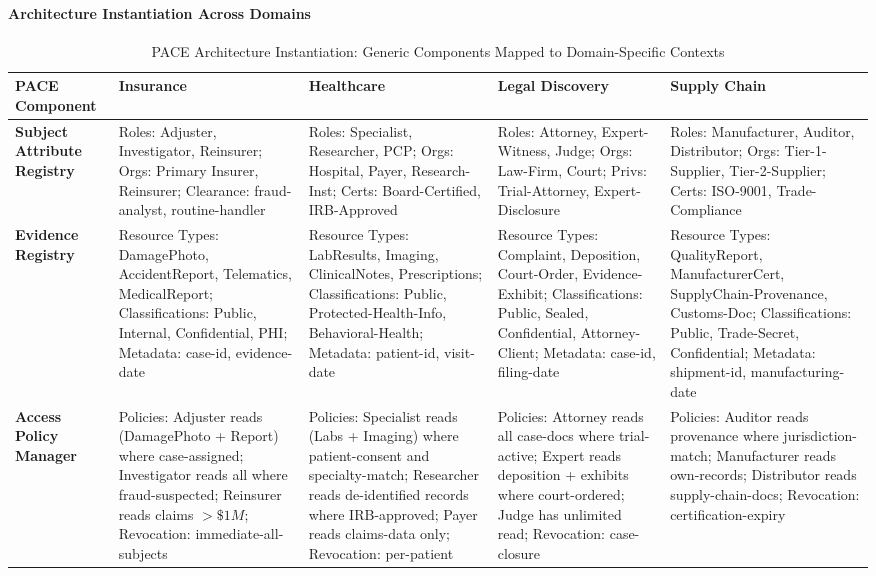 \documentclass[pdflatex,sn-mathphys-num]{sn-jnl}
\begin{document}
\paragraph{Architecture Instantiation Across Domains}
\begin{table}[!htbp]
\caption{PACE Architecture Instantiation: Generic Components Mapped to Domain-Specific Contexts}
\label{tab:domain-instantiation}
\centering
\begingroup
\scriptsize
\setlength{\tabcolsep}{2pt}
\renewcommand{\arraystretch}{1.15}
\begin{tabularx}{\textwidth}{@{}p{1.5cm}
>{\raggedright\arraybackslash}X
>{\raggedright\arraybackslash}X
>{\raggedright\arraybackslash}X
>{\raggedright\arraybackslash}X@{}}
\toprule
\textbf{PACE Component} &
\textbf{Insurance} &
\textbf{Healthcare} &
\textbf{Legal Discovery} &
\textbf{Supply Chain} \\
\midrule

\textbf{Subject Attribute Registry}
&
Roles: Adjuster, Investigator, Reinsurer; Orgs: Primary Insurer, Reinsurer; Clearance: fraud-analyst, routine-handler
&
Roles: Specialist, Researcher, PCP; Orgs: Hospital, Payer, Research-Inst; Certs: Board-Certified, IRB-Approved
&
Roles: Attorney, Expert-Witness, Judge; Orgs: Law-Firm, Court; Privs: Trial-Attorney, Expert-Disclosure
&
Roles: Manufacturer, Auditor, Distributor; Orgs: Tier-1-Supplier, Tier-2-Supplier; Certs: ISO-9001, Trade-Compliance
\\
\midrule

\textbf{Evidence Registry}
&
Resource Types: DamagePhoto, AccidentReport, Telematics, MedicalReport; Classifications: Public, Internal, Confidential, PHI; Metadata: case-id, evidence-date
&
Resource Types: LabResults, Imaging, ClinicalNotes, Prescriptions; Classifications: Public, Protected-Health-Info, Behavioral-Health; Metadata: patient-id, visit-date
&
Resource Types: Complaint, Deposition, Court-Order, Evidence-Exhibit; Classifications: Public, Sealed, Confidential, Attorney-Client; Metadata: case-id, filing-date
&
Resource Types: QualityReport, ManufacturerCert, SupplyChain-Provenance, Customs-Doc; Classifications: Public, Trade-Secret, Confidential; Metadata: shipment-id, manufacturing-date
\\
\midrule

\textbf{Access Policy Manager}
&
Policies: Adjuster reads (DamagePhoto + Report) where case-assigned; Investigator reads all where fraud-suspected; Reinsurer reads claims $>\$1M$; Revocation: immediate-all-subjects
&
Policies: Specialist reads (Labs + Imaging) where patient-consent and specialty-match; Researcher reads de-identified records where IRB-approved; Payer reads claims-data only; Revocation: per-patient
&
Policies: Attorney reads all case-docs where trial-active; Expert reads deposition + exhibits where court-ordered; Judge has unlimited read; Revocation: case-closure
&
Policies: Auditor reads provenance where jurisdiction-match; Manufacturer reads own-records; Distributor reads supply-chain-docs; Revocation: certification-expiry
\\
\midrule


\end{tabularx}
\end{table}
\end{document}
